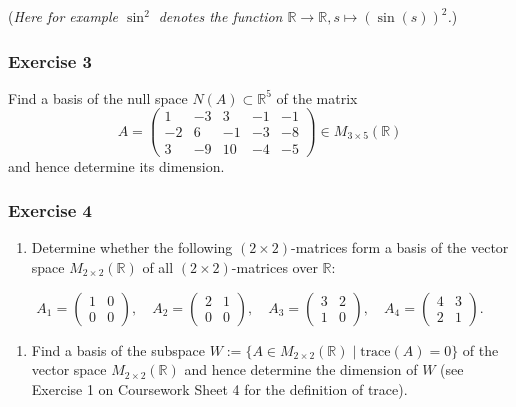 \documentclass[
  12pt,
  a4paper,
  twoside]{article}
\providecommand{\tightlist}{%
  \setlength{\itemsep}{0pt}\setlength{\parskip}{0pt}}
\theoremstyle{plain}
\theoremstyle{definition}
\begin{document}
(\emph{Here for example \(\sin^2\) denotes the function \(\mathbb{R} \rightarrow \mathbb{R}, s \mapsto (\sin(s))^2\).})

\hypertarget{exercise-3-5}{%
\subsubsection*{Exercise 3}\label{exercise-3-5}}

Find a basis of the null space \(N(A) \subset \mathbb{R}^5\) of the matrix
\[
A=\left(\begin{array}{ccccc}
 1 & -3 &  3 & -1 & -1 \\
-2 &  6 & -1 & -3 & -8 \\
 3 & -9 & 10 & -4 & -5
\end{array}\right) \in M_{3\times 5}(\mathbb{R})
\]
and hence determine its dimension.

\hypertarget{exercise-4-3}{%
\subsubsection*{Exercise 4}\label{exercise-4-3}}

\begin{enumerate}
\def\labelenumi{(\alph{enumi})}
\tightlist
\item
  Determine whether the following \((2 \times 2)\)-matrices
  form a basis of the vector space \(M_{2 \times 2}(\mathbb{R})\) of all
  \((2 \times 2)\)-matrices over \(\mathbb{R}\):
\end{enumerate}

\[A_1 = \left(\begin{array}{cc} 1 & 0 \\ 0 & 0 \end{array}\right),
\quad A_2 = \left(\begin{array}{cc} 2 & 1 \\ 0 & 0
\end{array}\right), \quad A_3 = \left(\begin{array}{cc} 3 & 2 \\ 1 &
0 \end{array}\right), \quad A_4 = \left(\begin{array}{cc} 4 & 3 \\
2 & 1 \end{array}\right).\]

\begin{enumerate}
\def\labelenumi{(\alph{enumi})}
\setcounter{enumi}{1}
\tightlist
\item
  Find a basis of the subspace \(W:= \{A \in M_{2 \times 2}(\mathbb{R}) \mid \textrm{trace}(A) = 0\}\) of the vector space \(M_{2 \times 2}(\mathbb{R})\) and hence determine the dimension of \(W\) (see
  Exercise 1 on Coursework Sheet 4 for the definition of trace).
\end{enumerate}
\end{document}
